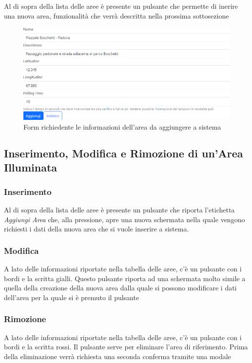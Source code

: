 \documentclass[a4paper, 12pt]{article}
\begin{document}
Al di sopra della lista delle aree è presente un pulsante che permette di inerire una nuova area, funzionalità che verrà descritta nella prossima sottosezione
\begin{figure}[H]
\centering
\includegraphics[width=\textwidth]{FormAggiuntaArea}
\caption{Form richiedente le informazioni dell'area da aggiungere a sistema}
\end{figure}

\subsection{Inserimento, Modifica e Rimozione di un'Area Illuminata}
\subsubsection{Inserimento}
Al di sopra della lista delle aree è presente un pulsante che riporta l'etichetta \textit{Aggiungi Area} che, alla pressione, apre una nuova schermata nella quale vengono richiesti i dati della nuova area che si vuole inserire a sistema.

\subsubsection{Modifica}
A lato delle informazioni riportate nella tabella delle aree, c'è un pulsante con i bordi e la scritta gialli. Questo pulsante riporta ad una schermata molto simile a quella della creazione della nuova area dalla quale si possono modificare i dati dell'area per la quale si è premuto il pulsante

\subsubsection{Rimozione}
A lato delle informazioni riportate nella tabella delle aree, c'è un pulsante con i bordi e la scritta rossi. Il pulsante serve per eliminare l'area di riferimento. Prima della eliminazione verrà richiesta una seconda conferma tramite una modale
\end{document}
